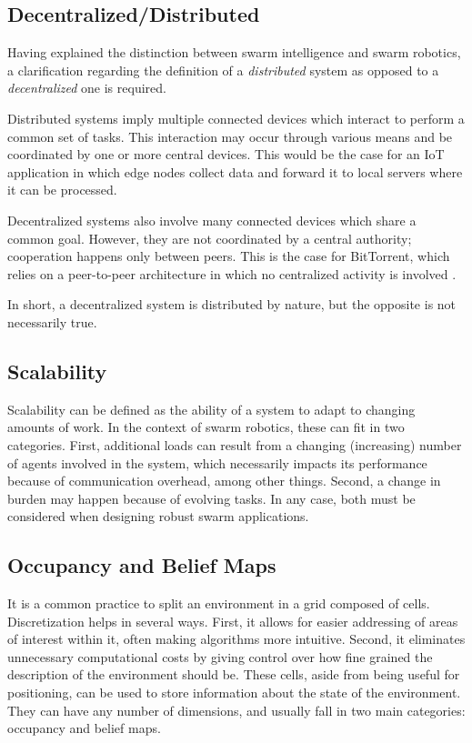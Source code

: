 \subsection{Decentralized/Distributed}
Having explained the distinction between swarm intelligence and swarm robotics, a clarification regarding the definition of a \textit{distributed} system as opposed to a \textit{decentralized} one is required.

Distributed systems imply multiple connected devices which interact to perform a common set of tasks. This interaction may occur through various means and be coordinated by one or more central devices. This would be the case for an \ac{IoT} application in which edge nodes collect data and forward it to local servers where it can be processed.

Decentralized systems also involve many connected devices which share a common goal. However, they are not coordinated by a central authority; cooperation happens only between peers. This is the case for BitTorrent, which relies on a peer-to-peer architecture in which no centralized activity is involved \cite{zhang2010unraveling}.

In short, a decentralized system is distributed by nature, but the opposite is not necessarily true.

\subsection{Scalability}
Scalability can be defined as the ability of a system to adapt to changing amounts of work. In the context of swarm robotics, these can fit in two categories. First, additional loads can result from a changing (increasing) number of agents involved in the system, which necessarily impacts its performance because of communication overhead, among other things. Second, a change in burden may happen because of evolving tasks. In any case, both must be considered when designing robust swarm applications.


\subsection{Occupancy and Belief Maps}
It is a common practice to split an environment in a grid composed of cells. Discretization helps in several ways. First, it allows for easier addressing of areas of interest within it, often making algorithms more intuitive. Second, it eliminates unnecessary computational costs by giving control over how fine grained the description of the environment should be.
These cells, aside from being useful for positioning, can be used to store information about the state of the environment. They can have any number of dimensions, and usually fall in two main categories: occupancy and belief maps.

